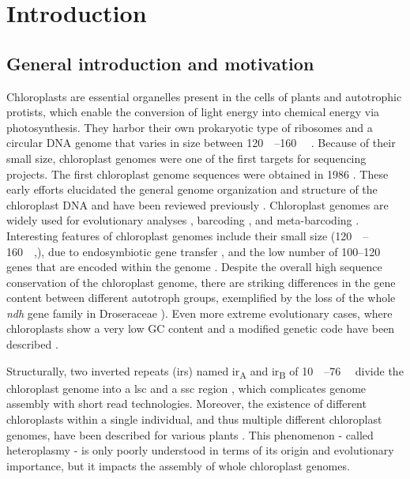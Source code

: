 \documentclass{bmcart}
\newcommand{\genename}[1]{\textit{#1}}
\begin{document}

\section*{Introduction}
\subsection*{General introduction and motivation}
Chloroplasts are essential organelles present in the cells of plants and autotrophic protists, which enable the conversion of light energy into chemical energy via photosynthesis. They harbor their own prokaryotic type of ribosomes and a circular DNA genome that varies in size between \SIrange{120}{160}{\kilo\basepair} \cite{palmer_1985}.
Because of their small size, chloroplast genomes were one of the first targets for sequencing projects.
The first chloroplast genome sequences were obtained in 1986 \cite{ohyama_chloroplast_1986,shinozaki_complete_1986}.
These early efforts elucidated the general genome organization and structure of the chloroplast DNA and have been reviewed previously \cite{wicke_evolution_2011,green_chloroplast_2011}.
Chloroplast genomes are widely used for evolutionary analyses \cite{martin_plastid_2010,xiao-ming_inferring_2017}, barcoding \cite{kress_use_2005,hollingsworth_dna_2009,de_vere_dna_2015}, and meta-barcoding \cite{bell_review_2016,deiner_environmental_2017}.
Interesting features of chloroplast genomes include their small size (\SIrange{120}{160}{\kilo\basepair},\cite{palmer_1985}), due to endosymbiotic gene transfer \cite{martin_evolutionary_2002,timmis_endosymbiotic_2004}, and the low number of \numrange{100}{120} genes that are encoded within the genome \cite{wicke_evolution_2011}.
Despite the overall high sequence conservation of the chloroplast genome, there are striking differences in the gene content between different autotroph groups, exemplified by the loss of the whole \genename{ndh} gene family in Droseraceae \cite{nevill_plastome-wide_2019}). Even more extreme evolutionary cases, where chloroplasts show a very low GC content and a modified genetic code have been described \cite{su_novel_2019}.

Structurally, two inverted repeats (\glspl{ir}) named \gls{ir}\textsubscript{A} and \gls{ir}\textsubscript{B} of \SIrange{10}{76}{\kilo\basepair} divide the chloroplast genome into a 
\gls{lsc} and a \gls{ssc} region
\cite{palmer_1985}, which complicates genome assembly with short read technologies\cite{Wang2018}.
Moreover, the existence of different chloroplasts within a single individual, and thus multiple different chloroplast genomes, have been described for various plants \cite{corriveau_1988,Chat2002,Scar2016}. This phenomenon - called heteroplasmy - is only poorly understood in terms of its origin and evolutionary importance, but it impacts the assembly of whole chloroplast genomes. 
\end{document}
